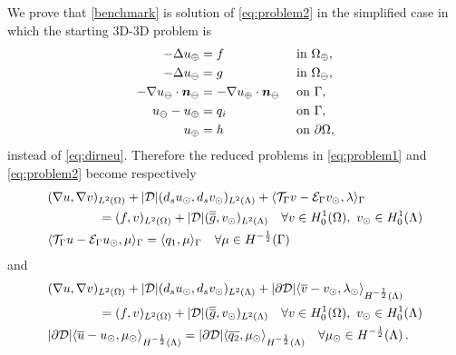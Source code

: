 \documentclass[r]{siamart171218}
\begin{document}
We prove that \eqref{benchmark} is solution of \eqref{eq:problem2} in the
simplified case in which the starting 3D-3D problem is
\begin{subequations}\label{eq:dirneu_simple}
\begin{align}
- \Delta u_{\oplus}  &= f  && \text{ in } \Omega_{\oplus},\\
- \Delta u_{\ominus} &= g  && \text{ in } \Omega_{\ominus},\\
-\nabla u_{\ominus} \cdot \boldsymbol n_{\ominus} &= -\nabla u_{\oplus} \cdot \boldsymbol n_{\ominus}  && \text{ on } \Gamma,\\
u_{\ominus} - u_{\oplus} &= q_i  && \text{ on }  \Gamma,\\
u_{\oplus} &= h && \text{ on } \partial \Omega,
\end{align}
\end{subequations}
instead of \eqref{eq:dirneu}. Therefore the reduced problems in \eqref{eq:problem1} and
\eqref{eq:problem2} become respectively
%
\begin{subequations}\label{eq:problem1_simple}
\begin{align}
\label{eq:problem1_simple_eq1}
&(\nabla u,\nabla v)_{L^2(\Omega)} + |{\cal D}|(d_s \ud,d_s \vd)_{L^2(\Lambda)} 
+ \langle \trace{v}  - \ext{\vd}, \lambda \rangle_\Gamma
\\
\nonumber
&\qquad\qquad= (f,v)_{L^2(\Omega)} + |{\cal D}| (\avrd{g},\vd)_{L^2(\Lambda)}
\quad \forall v \in H^1_0(\Omega), \ \vd \in H^1_0(\Lambda)
\\
\label{eq:problem1_simple_eq2}
&   \langle \trace{u} - \ext{\ud} , \mu \rangle_\Gamma =  \langle q_1 , \mu \rangle_\Gamma
\quad \forall \mu \in H^{-\frac12}(\Gamma)
\end{align}
\end{subequations}
and
\begin{subequations}\label{eq:problem2_simple}
  \begin{align}
    \label{eq:problem2_simple_eq1}
&(\nabla u,\nabla v)_{L^2(\Omega)} + |{\cal D}|(d_s \ud,d_s \vd)_{L^2(\Lambda)} 
+ |{\partial \cal D}| \langle \avrc{v} - \vd, \ld \rangle_{H^{-\frac12}(\Lambda)} 
\\
\nonumber
&\qquad\qquad= (f,v)_{L^2(\Omega)} + |{\cal D}| (\avrd{g}, \vd)_{L^2(\Lambda)}
\quad \forall v \in H^1_0(\Omega), \ \vd \in H^1_0(\Lambda)
\\
\label{eq:problem2_simple_eq2}
&  |\partial {\cal D}| \langle \avrc{u} -  \ud, \md \rangle_{H^{-\frac12}(\Lambda)} =
|\partial {\cal D}| \langle \avrc{q_2}, \md \rangle_{H^{-\frac12}(\Lambda)}
\quad \forall \md \in H^{-\frac12}(\Lambda)\,.
\end{align}
\end{subequations}
\end{document}
